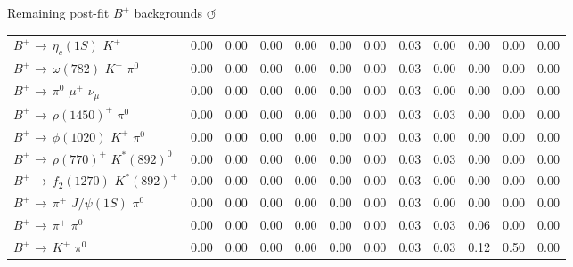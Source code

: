 \documentclass[xcolor=dvipsnames]{beamer}
\begin{document}
\begin{frame}{Remaining post-fit $B^+$ backgrounds \hyperlink{frame:A}{$\circlearrowleft$}}
{\begin{tabular}{lrrrrrrrrrrr}
      $B^{+}$ $\rightarrow$ $\eta_{c}(1S)$ $K^{+}$                                 &         0.00 &         0.00 &         0.00 &         0.00 &         0.00 &         0.00 &         0.03 &         0.00 &         0.00 &         0.00 &         0.00 \\
      $B^{+}$ $\rightarrow$ $\omega(782)$ $K^{+}$ $\pi^{0}$                        &         0.00 &         0.00 &         0.00 &         0.00 &         0.00 &         0.00 &         0.03 &         0.00 &         0.00 &         0.00 &         0.00 \\
      $B^{+}$ $\rightarrow$ $\pi^{0}$ $\mu^{+}$ $\nu_{\mu}$                        &         0.00 &         0.00 &         0.00 &         0.00 &         0.00 &         0.00 &         0.03 &         0.00 &         0.00 &         0.00 &         0.00 \\
      $B^{+}$ $\rightarrow$ $\rho(1450)^{+}$ $\pi^{0}$                             &         0.00 &         0.00 &         0.00 &         0.00 &         0.00 &         0.00 &         0.03 &         0.03 &         0.00 &         0.00 &         0.00 \\
      $B^{+}$ $\rightarrow$ $\phi(1020)$ $K^{+}$ $\pi^{0}$                         &         0.00 &         0.00 &         0.00 &         0.00 &         0.00 &         0.00 &         0.03 &         0.00 &         0.00 &         0.00 &         0.00 \\
      $B^{+}$ $\rightarrow$ $\rho(770)^{+}$ $K^{*}(892)^{0}$                       &         0.00 &         0.00 &         0.00 &         0.00 &         0.00 &         0.00 &         0.03 &         0.03 &         0.00 &         0.00 &         0.00 \\
      $B^{+}$ $\rightarrow$ $f_{2}(1270)$ $K^{*}(892)^{+}$                         &         0.00 &         0.00 &         0.00 &         0.00 &         0.00 &         0.00 &         0.03 &         0.00 &         0.00 &         0.00 &         0.00 \\
      $B^{+}$ $\rightarrow$ $\pi^{+}$ $J/\psi(1S)$ $\pi^{0}$                       &         0.00 &         0.00 &         0.00 &         0.00 &         0.00 &         0.00 &         0.03 &         0.00 &         0.00 &         0.00 &         0.00 \\
      $B^{+}$ $\rightarrow$ $\pi^{+}$ $\pi^{0}$                                    &         0.00 &         0.00 &         0.00 &         0.00 &         0.00 &         0.00 &         0.03 &         0.03 &         0.06 &         0.00 &         0.00 \\
      $B^{+}$ $\rightarrow$ $K^{+}$ $\pi^{0}$                                      &         0.00 &         0.00 &         0.00 &         0.00 &         0.00 &         0.00 &         0.03 &         0.03 &         0.12 &         0.50 &         0.00 \\

\end{tabular}}
\end{frame}
\end{document}
